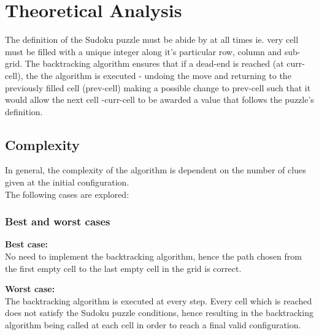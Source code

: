 \documentclass[12pt]{article}
\begin{document}
\section{Theoretical Analysis}
\begin{flushleft}
The definition of the Sudoku puzzle must be abide by at all times ie. very cell must be filled with a unique integer along it's particular row, column and sub-grid.  The backtracking algorithm ensures that if a dead-end is reached (at curr-cell), the the algorithm is executed - undoing the move and returning to the previously filled cell (prev-cell) making a possible change to prev-cell such that it would allow the next cell -curr-cell to be awarded a value that follows the puzzle's definition. 
\end{flushleft}
\subsection{Complexity}
\begin{flushleft}
In general, the complexity of the algorithm is dependent on the number of clues given at the initial configuration. \\
The following cases are explored:
\end{flushleft}

\subsubsection{Best and worst cases}
\begin{flushleft}
\textbf{Best case:}\\
No need to implement the backtracking algorithm, hence the path chosen from the first empty cell to the last empty cell in the grid is correct. 
\end{flushleft}
\begin{flushleft}
\textbf{Worst case:}\\
The backtracking algorithm is executed at every step. Every cell which is reached does not satisfy the Sudoku puzzle conditions, hence resulting in the backtracking algorithm being called at each cell in order to reach a final valid configuration.  
\end{flushleft}
\end{document}
